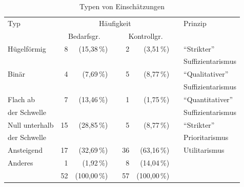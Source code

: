 \documentclass[justified,nobib,symmetric,twoside]{tufte-handout}
\begin{document}
\begin{table}[t]
   \caption{Typen von Einschätzungen}\label{tab:typen}
   \begin{center}
   \begin{tabular}{lrrrrrrl}
   \hline
   Typ              & \multicolumn{5}{c}{Häufigkeit}   &   & Prinzip                                                           \\
   \cline{2-6}
                    & \multicolumn{2}{c}{Bedarfsgr.}   &   & \multicolumn{2}{c}{Kontrollgr.}   &   &                           \\
   \hline\hline
   Hügelförmig      &  8   &  (15,38\,\%)              &   &  2   &   (3,51\,\%)               &   & \enquote{Strikter}        \\[-0.75ex]
                    &      &                           &   &      &                            &   & Suffizientarismus         \\[0.75ex]
   Binär            &  4   &   (7,69\,\%)              &   &  5   &   (8,77\,\%)               &   & \enquote{Qualitativer}    \\[-0.75ex]
                    &      &                           &   &      &                            &   & Suffizientarismus         \\[0.75ex]
   Flach ab         &  7   &  (13,46\,\%)              &   &  1   &   (1,75\,\%)               &   & \enquote{Quantitativer}   \\[-0.75ex]
   der Schwelle     &      &                           &   &      &                            &   & Suffizientarismus         \\[0.75ex]
   Null unterhalb   & 15   &  (28,85\,\%)              &   &  5   &   (8,77\,\%)               &   & \enquote{Strikter}        \\[-0.75ex]
   der Schwelle     &      &                           &   &      &                            &   & Prioritarismus            \\[0.75ex]
   Ansteigend       & 17   &  (32,69\,\%)              &   & 36   &  (63,16\,\%)               &   & Utilitarismus             \\[0.75ex]
   Anderes          &  1   &   (1,92\,\%)              &   &  8   &  (14,04\,\%)               &   &                           \\
   \hline
                    & 52   & (100,00\,\%)              &   & 57   & (100,00\,\%)               &   &                           \\
   \hline
   \end{tabular}
   \end{center}
\end{table}
\end{document}

